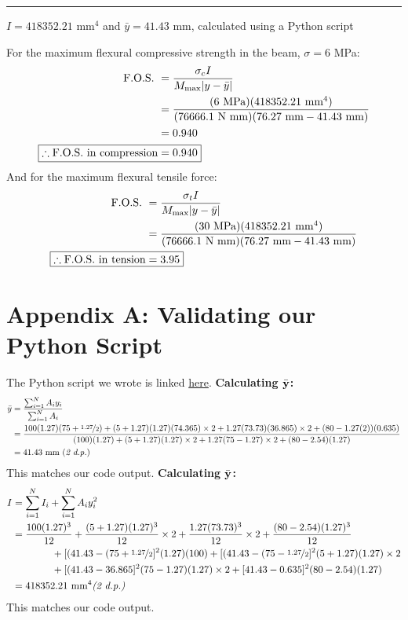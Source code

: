 \documentclass[11pt]{article}
\begin{document}
\noindent\rule[7pt]{\linewidth}{0.4pt}
$I = 418352.21$ mm$^4$ and $\bar{y} = 41.43$ mm, calculated using a Python script 

For the maximum flexural compressive strength in the beam, $\sigma = 6$ MPa:
\begin{align*}
\text{F.O.S. } &= \frac{\sigma_c I}{M_\text{max}|y-\bar{y}|}\\
               &= \frac{(6 \text{ MPa})(418352.21 \text{ mm}^4)}{(76666.1 \text{ N mm})(76.27\text{ mm}-41.43 \text { mm})} \\
               &= 0.940 \\
\Aboxed{\therefore \text{F.O.S. in compression}               &= 0.940} 
\end{align*}
And for the maximum flexural tensile force:
\begin{align*}
\text{F.O.S. } &= \frac{\sigma_t I}{M_\text{max}|y-\bar{y}|}\\
               &= \frac{(30 \text{ MPa})(418352.21 \text{ mm}^4)}{(76666.1 \text{ N mm})(76.27\text{ mm}-41.43 \text { mm})} \\
\Aboxed{\therefore \text{F.O.S. in tension}               &= 3.95} 
\end{align*}

\section{Appendix A: Validating our Python Script}
The Python script we wrote is linked \href{https://github.com/epsilon-naut/CIV102-Bridge-Project}{here}. \newline
\textbf{Calculating $\bar{\bf y}$:}
\begin{align*}
    \bar{y} &= \frac{\sum_{i=1}^{N}A_iy_i} {\sum_{i=1}^{N}A_i} \\
    &= \frac{100(1.27)(75+\nicefrac{1.27}{2}) + (5+1.27)(1.27)(74.365)\times 2 + 1.27(73.73)(36.865)\times 2 + (80-1.27(2))(0.635)}{(100)(1.27)+(5+1.27)(1.27)\times 2 + 1.27(75-1.27)\times 2 + (80-2.54)(1.27)} \\
    &= 41.43 \text{ mm (\textit{2 d.p.})}
\end{align*}
This matches our code output. \newline
\textbf{Calculating $\bar{\bf y}$:}
\begin{align*}
    I &= \sum_{i=1}^NI_i + \sum_{i=1}^{N}A_iy_i^2 \\
      &= \frac{100(1.27)^3}{12} + \frac{(5+1.27)(1.27)^3}{12}\times 2 + \frac{1.27(73.73)^3}{12}\times 2 + \frac{(80-2.54)(1.27)^3}{12} \\
      &\hspace{40pt} + [(41.43 - (75 + \nicefrac{1.27}{2}]^2(1.27)(100) + [(41.43 - (75 - \nicefrac{1.27}{2}]^2(5+1.27)(1.27)\times 2 \\
      &\hspace{40pt}+ [(41.43 - 36.865]^2(75-1.27)(1.27)\times 2 + [41.43 - 0.635]^2(80-2.54)(1.27) \\
      &= 418352.21 \text{ mm$^4$\textit{(2 d.p.)}}
\end{align*}
This matches our code output.
\end{document}
